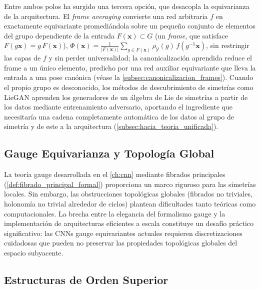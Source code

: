 Entre ambos polos ha surgido una tercera opción, que desacopla la equivarianza de la arquitectura. El \textit{frame averaging} \citep{puny2022frameaveraging} convierte una red arbitraria $f$ en exactamente equivariante promediándola sobre un pequeño conjunto de elementos del grupo dependiente de la entrada $F(\mathbf{x}) \subset G$ (un \textit{frame}, que satisface $F(g\mathbf{x}) = g\,F(\mathbf{x})$), $\Phi(\mathbf{x}) = \frac{1}{|F(\mathbf{x})|}\sum_{g \in F(\mathbf{x})} \rho_{\mathcal{Y}}(g)\, f(g^{-1}\mathbf{x})$, sin restringir las capas de $f$ y sin perder universalidad; la canonicalización aprendida \citep{kaba2023canonicalization} reduce el frame a un único elemento, predicho por una red auxiliar equivariante que lleva la entrada a una pose canónica (véase la \autoref{subsec:canonicalizacion_frames}). Cuando el propio grupo es desconocido, los métodos de descubrimiento de simetrías como LieGAN \citep{yang2023liegan} aprenden los generadores de un álgebra de Lie de simetrías a partir de los datos mediante entrenamiento adversario, aportando el ingrediente que necesitaría una cadena completamente automática de los datos al grupo de simetría y de este a la arquitectura (\autoref{subsec:hacia_teoria_unificada}).

\subsection{Gauge Equivarianza y Topología Global}

La teoría gauge desarrollada en el \autoref{ch:cnn} mediante fibrados principales (\autoref{def:fibrado_principal_formal}) proporciona un marco riguroso para las simetrías locales. Sin embargo, las obstrucciones topológicas globales (fibrados no triviales, holonomía no trivial alrededor de ciclos) plantean dificultades tanto teóricas como computacionales. La brecha entre la elegancia del formalismo gauge y la implementación de arquitecturas eficientes a escala constituye un desafío práctico significativo: las \glspl{CNN} gauge equivariantes actuales requieren discretizaciones cuidadosas que pueden no preservar las propiedades topológicas globales del espacio subyacente.

\subsection{Estructuras de Orden Superior}

